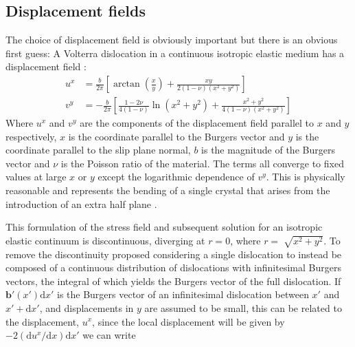

\subsection{Displacement fields}

The choice of displacement field is obviously important but there is an obvious first guess: A Volterra dislocation in a continuous isotropic elastic medium has a displacement field \cite{hirth_lothe1982volterra_displacements}:
\begin{subequations}
\begin{align}
u^x &= \frac{b}{2\pi}\left[ \arctan\left(\frac{x}{y}\right) + \frac{xy}{2(1-\nu)(x^2 + y^2)} \right] \\[0.5ex]
v^y &= -\frac{b}{2\pi} \left[ \frac{1-2\nu}{4(1-\nu)} \ln(x^2 + y^2) + \frac{x^2 + y^2}{4(1-\nu)(x^2 + y^2)} \right]
\end{align}
\end{subequations}
Where $u^x$ and $v^y$ are the components of the displacement field parallel to $x$ and $y$ respectively, $x$ is the coordinate parallel to the Burgers vector and $y$ is the coordinate parallel to the slip plane normal, $b$ is the magnitude of the Burgers vector and $\nu$ is the Poisson ratio of the material. The terms all converge to fixed values at large $x$ or $y$ except the logarithmic dependence of $v^y$. This is physically reasonable and represents the bending of a single crystal that arises from the introduction of an extra half plane \cite{hirth_lothe1982volterra_displacements}.

This formulation of the stress field and subsequent solution for an isotropic elastic continuum is discontinuous, diverging at $r=0$, where $r=\sqrt[]{x^2+y^2}$. To remove the discontinuity \citet{Eshelby1949} proposed considering a single dislocation to instead be composed of a continuous distribution of dislocations with infinitesimal Burgers vectors, the integral of which yields the Burgers vector of the full dislocation. If $\bm{b}'(x')\mathrm{d}x'$ is the Burgers vector of an infinitesimal dislocation between $x'$ and $x'+\mathrm{d} x'$, and displacements in $y$ are assumed to be small, this can be related to the displacement, $u^x$, since the local displacement will be given by $-2(\mathrm{d} u^x/\mathrm{d} x)\mathrm{d} x'$ \cite{hirth_lothe1982peierls_displacements} we can write


